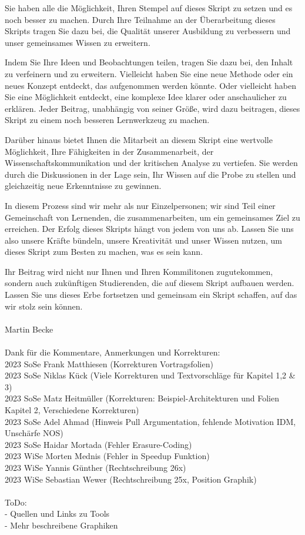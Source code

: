 \documentclass[a4paper]{article}
\begin{document}
Sie haben alle die Möglichkeit, Ihren Stempel auf dieses Skript zu setzen und es noch besser zu machen. Durch Ihre Teilnahme an der Überarbeitung dieses Skripts tragen Sie dazu bei, die Qualität unserer Ausbildung zu verbessern und unser gemeinsames Wissen zu erweitern.

Indem Sie Ihre Ideen und Beobachtungen teilen, tragen Sie dazu bei, den Inhalt zu verfeinern und zu erweitern. Vielleicht haben Sie eine neue Methode oder ein neues Konzept entdeckt, das aufgenommen werden könnte. Oder vielleicht haben Sie eine Möglichkeit entdeckt, eine komplexe Idee klarer oder anschaulicher zu erklären. Jeder Beitrag, unabhängig von seiner Größe, wird dazu beitragen, dieses Skript zu einem noch besseren Lernwerkzeug zu machen.

Darüber hinaus bietet Ihnen die Mitarbeit an diesem Skript eine wertvolle Möglichkeit, Ihre Fähigkeiten in der Zusammenarbeit, der Wissenschaftskommunikation und der kritischen Analyse zu vertiefen. Sie werden durch die Diskussionen in der Lage sein, Ihr Wissen auf die Probe zu stellen und gleichzeitig neue Erkenntnisse zu gewinnen.

In diesem Prozess sind wir mehr als nur Einzelpersonen; wir sind Teil einer Gemeinschaft von Lernenden, die zusammenarbeiten, um ein gemeinsames Ziel zu erreichen. Der Erfolg dieses Skripts hängt von jedem von uns ab. Lassen Sie uns also unsere Kräfte bündeln, unsere Kreativität und unser Wissen nutzen, um dieses Skript zum Besten zu machen, was es sein kann.

Ihr Beitrag wird nicht nur Ihnen und Ihren Kommilitonen zugutekommen, sondern auch zukünftigen Studierenden, die auf diesem Skript aufbauen werden. Lassen Sie uns dieses Erbe fortsetzen und gemeinsam ein Skript schaffen, auf das wir stolz sein können.
\\\\
Martin Becke
\\\\
Dank für die Kommentare, Anmerkungen und Korrekturen:  \\
2023 SoSe Frank Matthiesen (Korrekturen Vortragsfolien) \\
2023 SoSe Niklas Kück (Viele Korrekturen und Textvorschläge für Kapitel 1,2 \& 3)\\
2023 SoSe Matz Heitmüller (Korrekturen: Beispiel-Architekturen und Folien Kapitel 2, Verschiedene Korrekturen) \\
2023 SoSe Adel Ahmad (Hinweis Pull Argumentation, fehlende Motivation IDM, Unschärfe NOS) \\
2023 SoSe Haidar Mortada (Fehler  Erasure-Coding) \\  
2023 WiSe Morten Mednis (Fehler in Speedup Funktion) \\
2023 WiSe Yannis Günther (Rechtschreibung 26x) \\
2023 WiSe Sebastian Wewer (Rechtschreibung 25x, Position Graphik) \\
\\
ToDo:\\
- Quellen und Links zu Tools\\
- Mehr beschreibene Graphiken\\
\end{document}
